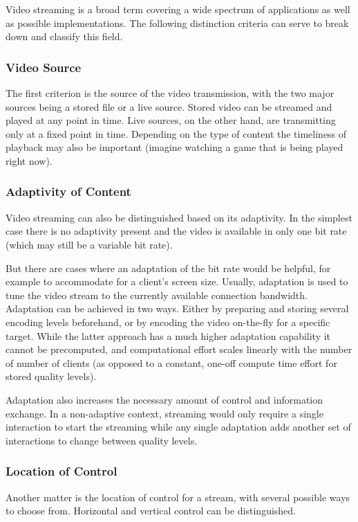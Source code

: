 Video streaming is a broad term covering a wide spectrum of applications as well as possible implementations. The following distinction criteria can serve to break down and classify this field.

\subsubsection{Video Source}
The first criterion is the source of the video transmission, with the two major sources being a stored file or a live source. Stored video can be streamed and played at any point in time. Live sources, on the other hand, are transmitting only at a fixed point in time. Depending on the type of content the timeliness of playback may also be important (imagine watching a game that is being played right now).


\subsubsection{Adaptivity of Content}
Video streaming can also be distinguished based on its adaptivity. In the simplest case there is no adaptivity present and the video is available in only one bit rate (which may still be a variable bit rate). 

But there are cases where an adaptation of the bit rate would be helpful, for example to accommodate for a client's screen size. Usually, adaptation is used to tune the video stream to the currently available connection bandwidth. Adaptation can be achieved in two ways. Either by preparing and storing several encoding levels beforehand, or by encoding the video on-the-fly for a specific target. While the latter approach has a much higher adaptation capability it cannot be precomputed, and computational effort scales linearly with the number of  number of clients (as opposed to a constant, one-off compute time effort for stored quality levels).

Adaptation also increases the necessary amount of control and information exchange. In a non-adaptive context, streaming would only require a single interaction to start the streaming while any single adaptation adds another set of interactions to change between quality levels.


\subsubsection{Location of Control}
Another matter is the location of control for a stream, with several possible ways to choose from. Horizontal and vertical control can be distinguished.

